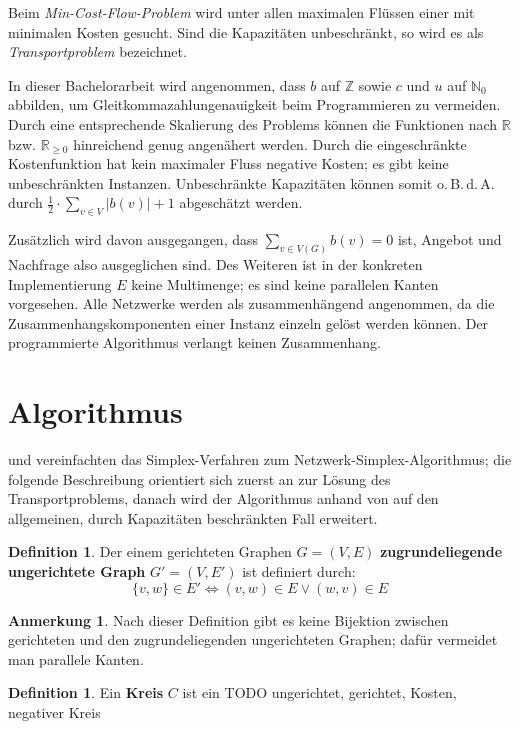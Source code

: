 \documentclass[a4paper,twoside,ngerman]{report}
\theoremstyle{plain}
\theoremstyle{definition}
\newtheorem{defn}[thm]{Definition}
\newtheorem*{anm}{Anmerkung}
\newcommand{\obda}{o.\,B.\,d.\,A. }
\begin{document}
Beim \emph{Min-Cost-Flow-Problem} wird unter allen maximalen Flüssen einer mit minimalen Kosten gesucht. Sind die Kapazitäten unbeschränkt, so wird es als \emph{Transportproblem} bezeichnet.

In dieser Bachelorarbeit wird angenommen, dass $b$ auf $\mathbb{Z}$ sowie $c$ und $u$ auf $\mathbb{N}_0$ abbilden, um Gleitkommazahlungenauigkeit beim Programmieren zu vermeiden. Durch eine entsprechende Skalierung des Problems können die Funktionen nach $\mathbb{R}$ bzw. $\mathbb{R}_{\geq 0}$ hinreichend genug angenähert werden. Durch die eingeschränkte Kostenfunktion hat kein maximaler Fluss negative Kosten; es gibt keine unbeschränkten Instanzen. Unbeschränkte Kapazitäten können somit \obda durch $\frac{1}{2}\cdot\sum_{v\in V} |b(v)| + 1$ abgeschätzt werden.

Zusätzlich wird davon ausgegangen, dass $\sum_{v\in V(G)} b(v) = 0$ ist, Angebot und Nachfrage also ausgeglichen sind. Des Weiteren ist in der konkreten Implementierung $E$ keine Multimenge; es sind keine parallelen Kanten vorgesehen. Alle Netzwerke werden als zusammenhängend angenommen, da die Zusammenhangskomponenten einer Instanz einzeln gelöst werden können. Der programmierte Algorithmus verlangt keinen Zusammenhang.

\section{Algorithmus}
\cite[Dantzig, 1951]{erf1} und \cite[Orden, 1956]{erf2} vereinfachten das Simplex-Verfahren zum Netzwerk-Simplex-Algorithmus; die folgende Beschreibung orientiert sich zuerst an \cite[S. 291\,ff.]{NSAbook} zur Lösung des Transportproblems, danach wird der Algorithmus anhand von \cite[S. 353\,ff.]{NSAbook} auf den allgemeinen, durch Kapazitäten beschränkten Fall erweitert.

\begin{defn}Der einem gerichteten Graphen $G=(V,E)$ \textbf{zugrundeliegende ungerichtete Graph} $G'=(V,E')$ ist definiert durch:
\begin{equation*}\{v,w\}\in E' \iff (v,w) \in E \lor (w,v) \in E\end{equation*} \end{defn}
\begin{anm}Nach dieser Definition gibt es keine Bijektion zwischen gerichteten und den zugrundeliegenden ungerichteten Graphen; dafür vermeidet man parallele Kanten.\end{anm}

\begin{defn}Ein \textbf{Kreis} $C$ ist ein TODO ungerichtet, gerichtet, Kosten, negativer Kreis\end{defn}
\end{document}
